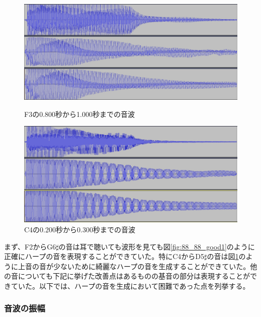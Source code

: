 \begin{figure}[b]
\begin{center}
\begin{minipage}{0.48\hsize}
\begin{center}
\includegraphics[width=0.9\hsize]{figure/88_88/f3.png}
\caption{F3の0.800秒から1.000秒までの音波}
\label{fig:88_88_good1}
\end{center}
\end{minipage}
\begin{minipage}{0.48\hsize}
\begin{center}
\includegraphics[width=0.9\hsize]{figure/88_88/c4.png}
\caption{C4の0.200秒から0.300秒までの音波}
\label{fig:88_88_good2}
\end{center}
\end{minipage}
\end{center}
\end{figure}


まず、F2からG6$\sharp$の音は耳で聴いても波形を見ても図\ref{fig:88_88_good1}のように正確にハープの音を表現することができていた。特にC4からD5$\sharp$の音は図\ref{fig:88_88_good2}のように上音の音が少ないために綺麗なハープの音を生成することができていた。他の音についても下記に挙げた改善点はあるものの基音の部分は表現することができていた。以下では、ハープの音を生成において困難であった点を列挙する。


\subsubsection{音波の振幅}

